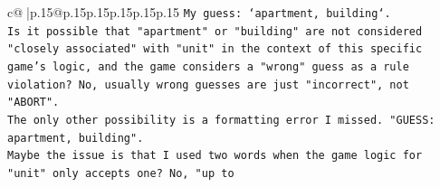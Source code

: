 \documentclass{article}
\begin{document}
{\begin{supertabular}{c@{$\;$}|p{.15\linewidth}@{}p{.15\linewidth}p{.15\linewidth}p{.15\linewidth}p{.15\linewidth}p{.15\linewidth}}
{{{\texttt{My guess: `apartment, building`.} \\
\texttt{Is it possible that "apartment" or "building" are not considered "closely associated" with "unit" in the context of this specific game's logic, and the game considers a "wrong" guess as a rule violation? No, usually wrong guesses are just "incorrect", not "ABORT".} \\
\texttt{The only other possibility is a formatting error I missed. "GUESS: apartment, building".} \\
\texttt{Maybe the issue is that I used two words when the game logic for "unit" only accepts one? No, "up to} \\
            }
        }
    }
     \\ \\

\end{supertabular}
}
\end{document}
